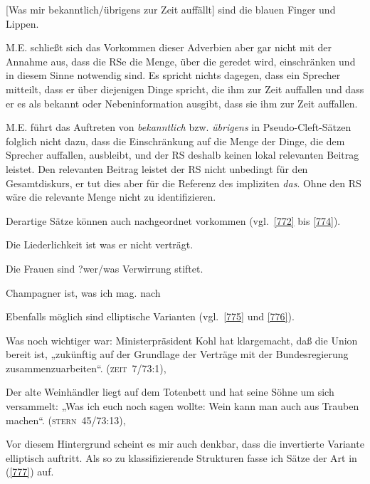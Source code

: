 \begin{exe}
	\ex\label{771} 
	[Was mir bekanntlich/übrigens zur Zeit auffällt] sind die blauen Finger und Lippen.
\end{exe}	
M.E. schließt sich das Vorkommen dieser Adverbien aber gar nicht mit der Annahme aus, dass die RSe die Menge, über die geredet wird, einschränken und in diesem Sinne notwendig sind. Es spricht nichts dagegen, dass ein Sprecher mitteilt, dass er über diejenigen Dinge spricht, die ihm zur Zeit auffallen und dass er es als bekannt oder Nebeninformation ausgibt, dass sie ihm zur Zeit auffallen. 

M.E. führt das Auftreten von \textit{bekanntlich} bzw. \textit{übrigens} in Pseudo-Cleft-Sätzen folglich nicht dazu, dass die Einschränkung auf die Menge der Dinge, die dem Sprecher auffallen, ausbleibt, und der RS deshalb keinen lokal relevanten Beitrag leistet. Den relevanten Beitrag leistet der RS nicht unbedingt für den Gesamtdiskurs, er tut dies aber für die Referenz des impliziten \textit{das}. Ohne den RS wäre die relevante Menge nicht zu identifizieren.

Derartige Sätze können auch nachgeordnet vorkommen (vgl.\ \ref{772} bis \ref{774}).

\begin{exe}
	\ex\label{772} 
	Die Liederlichkeit ist was er nicht verträgt.
	\hfill\hbox{\citet[327]{Birkner2008}}
\end{exe}

\begin{exe}
	\ex\label{773} 
	Die Frauen sind ?wer/was Verwirrung stiftet.
	\hfill\hbox{\citet[13]{Altmann2009}}
\end{exe}

\begin{exe}
	\ex\label{774} 
	Champagner ist, was ich mag.
	\hfill\hbox{nach \citet[467]{Lambrecht2001}}
\end{exe}
Ebenfalls möglich sind elliptische Varianten (vgl.\ \ref{775} und \ref{776}).

\begin{exe}
	\ex\label{775} 

	Was noch wichtiger war: Ministerpräsident Kohl hat klargemacht, daß die Union bereit ist, „zukünftig auf der Grundlage 	der Verträge mit der Bundesregierung zusammenzuarbeiten“. 	
	\hbox{}\hfill\hbox{{\scshape(zeit 7/73:1)}, \citet[74--75]{Dyhr1978}}	
\end{exe}

\begin{exe}
	\ex\label{776} 

	Der alte Weinhändler liegt auf dem Totenbett und hat seine Söhne um sich versammelt: „Was ich euch noch sagen wollte: 		Wein kann man auch aus Trauben machen“. 	
	\hbox{}\hfill\hbox{{\scshape(stern 45/73:13)}, \citet[93]{Dyhr1978}}	
\end{exe}
Vor diesem Hintergrund scheint es mir auch denkbar, dass die invertierte Variante elliptisch auftritt. Als so zu klassifizierende Strukturen fasse ich Sätze der Art in (\ref{777}) auf.

